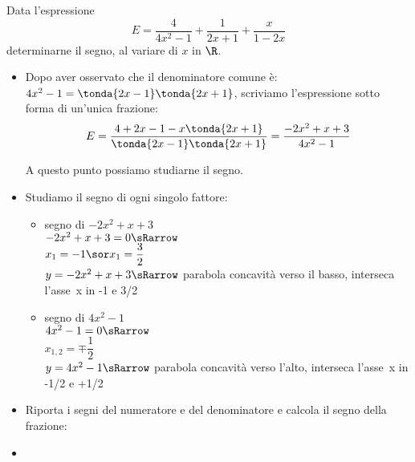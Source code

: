 \begin{esempio}
Data l'espressione 
\[E=\dfrac{4}{4x^2-1}+\dfrac {1}{2x+1}+\dfrac{x}{1-2x}\]
determinarne il segno, al variare di \(x\) in \(\R\).

\newpage %

\begin{itemize}

\item Dopo aver osservato che il denominatore comune è:
\(4x^2-1 =\tonda{2x-1}\tonda{2x+1}\), scriviamo 
l'espressione sotto forma di un'unica frazione:
\[E=\dfrac{4+2x-1 - x \tonda{2x+1}}{\tonda{2x-1}\tonda{2x+1}} =
\dfrac{-2x^2+x+3}{4x^2-1}\]

A questo punto possiamo studiarne il segno.

 \item Studiamo il segno di ogni singolo fattore:

\begin{itemize}

 \item  segno di \(-2x^2+x+3\)\\
 \segnofatt
   {\(-2x^2+x+3=0 \sRarrow\)\\
  \(x_1=-1 \sor x_1=\dfrac{3}{2}\)}
   {\\ \(y=-2x^2+x+3 \sRarrow \)}
   {parabola concavità verso il basso, interseca l'asse~x in -1 e 3/2}
   {}
 \item segno di \(4x^2-1\)\\
 \segnofatt
   {\(4x^2-1=0 \sRarrow \) \\
  \(x_{1,2}=\mp\dfrac{1}{2}\)}
   {\\ \(y=4x^2-1 \sRarrow\)}
   {parabola concavità verso l'alto, interseca l'asse~x in -1/2 e +1/2}
   {}
\end{itemize}
 \item Riporta i segni del numeratore e del denominatore e calcola
il segno della frazione:

\begin{inaccessibleblock}
  \begin{center}
  \segnofrazioneb
  \end{center}
\end{inaccessibleblock}
\item 
 \insiemesoluzione
   {}
   {}
   {}
\end{itemize}
\end{esempio}


